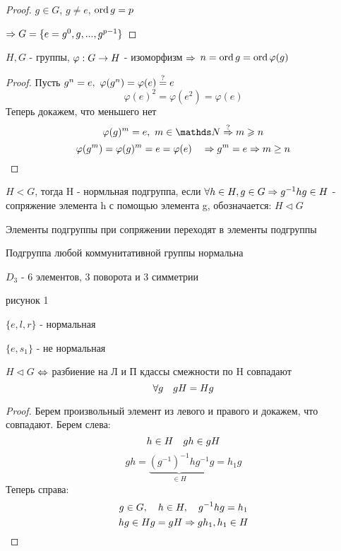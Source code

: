 \documentclass[12pt, fleqn]{article}
\begin{document}
\begin{proof}
    $g \in G$, $g \neq e$, $\mathop{\rm ord}\nolimits g=p$
    
    $\Rightarrow G=\{e=g^0,g,...,g^{p-1}\}$
\end{proof}

\begin{utv}
    $H,G$ - группы, $\varphi: G \rightarrow H$ - изоморфизм $\Rightarrow$ $n=\mathop{\rm ord}\nolimits g=\mathop{\rm ord}\nolimits \varphi(g)$
\end{utv}

\begin{proof}
    Пусть $g^n=e,\ \varphi(g^n)=\varphi(e)\os{?}{=}e$
    \[\varphi(e)^2=\varphi(e^2)=\varphi(e)\]
    Теперь докажем, что меньшего нет
    \[\varphi(g)^m = e,\ m \in \N \os{?}{\Ra} m \geqslant n\]
	\[\varphi(g^m) = \varphi(g)^m = e = \varphi(e) \quad \Rightarrow g^m = e \Rightarrow m \geq n\]
\end{proof}

\begin{definition}
    $H<G$, тогда H - нормльная подгруппа, если $\forall h \in H, g \in G \Rightarrow g^{-1}h g \in H$ - сопряжение элемента h с помощью элемента g, обозначается: $H \triangleleft G$
\end{definition}

\begin{remark}
    Элементы подгруппы при сопряжении переходят в элементы подгруппы
\end{remark}

\begin{remark}
    Подгруппа любой коммунитативной группы нормальна
\end{remark}

\begin{example}
    $D_3$ - 6 элементов, 3 поворота и 3 симметрии
    
    рисунок 1
    
    $\{e,l,r\}$ - нормальная
    
    $\{e, s_1\}$ - не нормальная
\end{example}

\begin{utv}
    $H \triangleleft G$ $\Leftrightarrow$ разбиение на Л и П кдассы смежности по H совпадают
    \[\forall g \quad gH = Hg\]
\end{utv}

\begin{proof}
    Берем произвольный элемент из левого и правого и докажем, что совпадают. Берем слева:
    \[h \in H \quad g h \in g H\]
    \[g h = \underbrace{(g^{-1})^{-1} h g^{-1}}_{\in H} g = h_1 g\]
    Теперь справа:
    \[g \in G,\quad h \in H,\quad g^{-1}h g=h_1\]
    \[h g \in H g = g H \Rightarrow g h_1, h_1 \in H\]
\end{proof}
\end{document}
